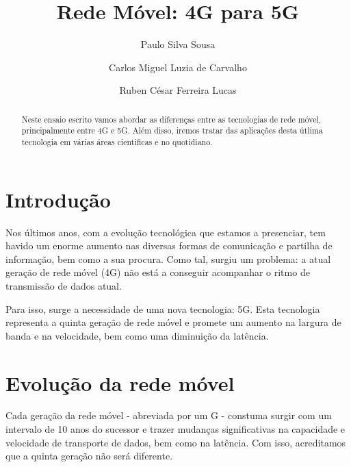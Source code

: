 \documentclass{llncs}
\begin{document}
\mainmatter
\title{Rede Móvel: 4G para 5G}


\author{Paulo Silva Sousa \and Carlos Miguel Luzia de Carvalho \and Ruben César Ferreira Lucas}



\date{}


\maketitle
\begin{abstract}
Neste ensaio escrito vamos abordar as diferenças entre as tecnologias de rede móvel, principalmente entre 4G e 5G. Além disso, iremos tratar das aplicações desta útlima tecnologia em várias áreas cientificas e no quotidiano.
\end{abstract}

\section{Introdução}
Nos últimos anos, com a evolução tecnológica que estamos a presenciar, tem havido um enorme aumento nas diversas formas de comunicação e partilha de informação, bem como a sua procura. Como tal, surgiu um problema: a atual geração de rede móvel (4G) não está a conseguir acompanhar o ritmo de transmissão de dados atual.

Para isso, surge a necessidade de uma nova tecnologia: 5G. Esta tecnologia representa a quinta geração de rede móvel e promete um aumento na largura de banda e na velocidade, bem como uma diminuição da latência.

\section{Evolução da rede móvel}

Cada geração da rede móvel - abreviada por um G - constuma surgir com um intervalo de 10 anos do sucessor e trazer mudanças significativas na capacidade e velocidade de transporte de dados, bem como na latência. Com isso, acreditamos que a quinta geração não será diferente.
\end{document}
